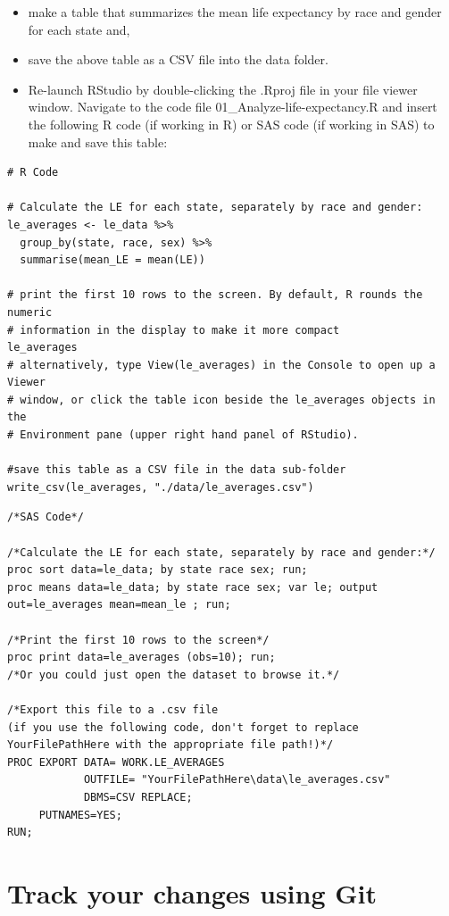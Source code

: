 \documentclass[
]{book}
\begin{document}
\begin{itemize}
\item
  make a table that summarizes the mean life expectancy by race and
  gender for each state and,
\item
  save the above table as a CSV file into the data folder.
\item
  Re-launch RStudio by double-clicking the .Rproj file in your file viewer
  window. Navigate to the code file 01\_Analyze-life-expectancy.R and insert the
  following R code (if working in R) or SAS code (if working in SAS) to make and save this table:
\end{itemize}

\begin{verbatim}
# R Code

# Calculate the LE for each state, separately by race and gender:
le_averages <- le_data %>% 
  group_by(state, race, sex) %>%
  summarise(mean_LE = mean(LE)) 

# print the first 10 rows to the screen. By default, R rounds the numeric 
# information in the display to make it more compact 
le_averages
# alternatively, type View(le_averages) in the Console to open up a Viewer 
# window, or click the table icon beside the le_averages objects in the 
# Environment pane (upper right hand panel of RStudio).

#save this table as a CSV file in the data sub-folder
write_csv(le_averages, "./data/le_averages.csv")
\end{verbatim}

\begin{verbatim}
/*SAS Code*/

/*Calculate the LE for each state, separately by race and gender:*/
proc sort data=le_data; by state race sex; run;
proc means data=le_data; by state race sex; var le; output out=le_averages mean=mean_le ; run;

/*Print the first 10 rows to the screen*/
proc print data=le_averages (obs=10); run;
/*Or you could just open the dataset to browse it.*/

/*Export this file to a .csv file 
(if you use the following code, don't forget to replace YourFilePathHere with the appropriate file path!)*/
PROC EXPORT DATA= WORK.LE_AVERAGES 
            OUTFILE= "YourFilePathHere\data\le_averages.csv" 
            DBMS=CSV REPLACE;
     PUTNAMES=YES;
RUN;
\end{verbatim}

\hypertarget{track-your-changes-using-git}{%
\section{Track your changes using Git}\label{track-your-changes-using-git}}
\end{document}

